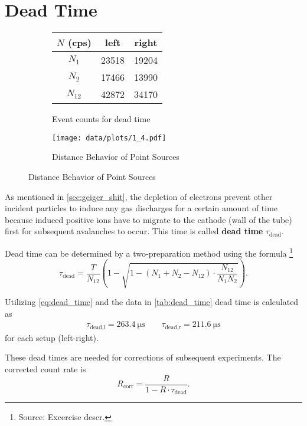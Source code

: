 \section{Dead Time}
\begin{figure}[tbp]
	\begin{subfigure}{.34\textwidth}
		\centering
		\caption{Event counts for dead time}
		\label{tab:dead_time}
		\begin{tabular}{SSS}
			\toprule
			{$N$ (cps)}	&	{left}&	{right}\\
			\midrule
				{$N_1$}	&	\num{23518}	&	\num{19204}	\\
				{$N_2$}	&	\num{17466}	&	\num{13990}	\\
				{$N_{12}$}	&	\num{42872}	&	\num{34170}	\\
			\bottomrule
		\end{tabular}
	\end{subfigure}
	\begin{subfigure}{.64\textwidth}
		\centering
		\texttt{[image: data/plots/1\_4.pdf]}
		\caption{Distance Behavior of Point Sources}
		\label{fig:invsq}
	\end{subfigure}
\end{figure}

As mentioned in \autoref{sec:geiger_shit}, the depletion of electrons prevent other incident particles to induce any gas discharges for a certain amount of time because induced positive ions have to migrate to the cathode (wall of the tube) first for subsequent avalanches to occur.
This time is called \textbf{dead time} $\tau_\text{dead}$.

Dead time can be determined by a two-preparation method using the formula \footnote{Source: Excercise descr.}
\begin{equation}\label{eq:dead_time}
	\tau_\text{dead} = \frac{T}{N_{12}}\left(1-\sqrt{1-\left(N_1+N_2-N_{12}\right)\cdot\frac{N_{12}}{N_1N_2}}\right).
\end{equation}

Utilizing \autoref{eq:dead_time} and the data in \autoref{tab:dead_time} dead time is calculated as
\begin{gather*}
 	\tau_\text{dead,l}=\SI{263.4}{\micro\second}\qquad \tau_\text{dead,r}=\SI{211.6}{\micro\second}
\end{gather*}
for each setup (left-right).

These dead times are needed for corrections of subsequent experiments.
The corrected count rate is
\begin{equation}\label{eq:dead_time_corr}
	R_\text{corr}=\frac{R}{1-R\cdot\tau_\text{dead}}.
\end{equation}

